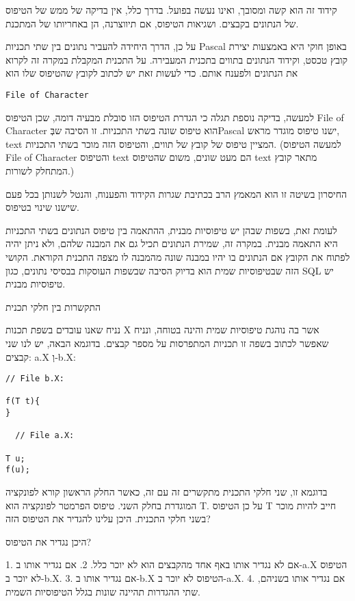       קידוד זה הוא קשה ומסובך, ואינו נעשה בפועל. בדרך כלל, אין בדיקה של ממש של הטיפוס
      של הנתונים בקבצים. ושגיאות הטיפוס, אם תיווצרנה, הן באחריותו של המתכנת.

      על כן, הדרך היחידה להעביר נתונים בין שתי תכניות Pascal באופן חוקי היא באמצעות
      יצירת קובץ טכסט, וקידוד הנתונים בתווים בתכנית המעבירה. על התכנית המקבלת במקרה
      זה לקרוא את הנתונים ולפענח אותם. כדי לעשות זאת יש לכתוב לקובץ שהטיפוס שלו הוא

\begin{verbatim}
File of Character
\end{verbatim}
      למעשה, בדיקה נוספת תגלה כי הגדרת הטיפוס הזו סובלת מבעיה דומה, שכן הטיפוס File
      of Character הוא טיפוס שונה בשתי התכניות. זו הסיבה שבְּPascal ישנו טיפוס מוגדר
      מראש, text המציין טיפוס של קובץ של תווים, והטיפוס הזה מוכר בשתי התכניות. (למעשה
      הטיפוס File of Character והטיפוס text הם מעט שונים, משום שהטיפוס text מתאר קובץ
      המתחלק לשורות.)

      החיסרון בשיטה זו הוא המאמץ הרב בכתיבת שגרות הקידוד והפענוח, והנטל לשנותן בכל
      פעם שישנו שינוי בטיפוס.

      לעומת זאת, בשפות שבהן יש טיפוסיות מבנית, ההתאמה בין טיפוס הנתונים בשתי התכניות
      היא התאמה מבנית. במקרה זה, שמירת הנתונים תכיל גם את המבנה שלהם, ולא ניתן יהיה
      לפתוח את הקובץ אם הנתונים בו יהיו במבנה שונה מהמבנה לו מצפה התכנית הקוראת.
      הקושי הזה שבטיפוסיות שמית הוא בדיוק הסיבה שבשפות העוסקות בבסיסי נתונים, כגון
      SQL יש טיפוסיות מבנית.

      התקשרות בין חלקי תכנית

      נניח שאנו עובדים בשפת תכנות X אשר בה נוהגת טיפוסיות שמית והינה בטוחה, ונניח שאפשר לכתוב בשפה זו תכניות המתפרסות על מספר קבצים. בדוגמא הבאה, יש לנו שני קבצים: a.X וְ-b.X:

\begin{verbatim}
// File b.X:

f(T t){
}

  // File a.X:

T u;
f(u);
\end{verbatim}

      בדוגמא זו, שני חלקי התכנית מתקשרים זה עם זה, כאשר החלק הראשון קורא לפונקציה
      המוגדרת בחלק השני. טיפוס הפרמטר לפונקציה הוא T. על כן הטיפוס T חייב להיות מוכר
      בשני חלקי התכנית. היכן עלינו להגדיר את הטיפוס הזה?

      היכן נגדיר את הטיפוס?

      1. אם לא נגדיר אותו באף אחד מהקבצים הוא לא יוכר כלל.
      2. אם נגדיר אותו ב-a.X הטיפוס לא יוכר ב-b.X.
      3. אם נגדיר אותו ב-b.X הטיפוס לא יוכר ב-a.X.
      4. אם נגדיר אותו בשניהם, שתי ההגדרות תהיינה שונות בגלל הטיפוסיות השמית.

